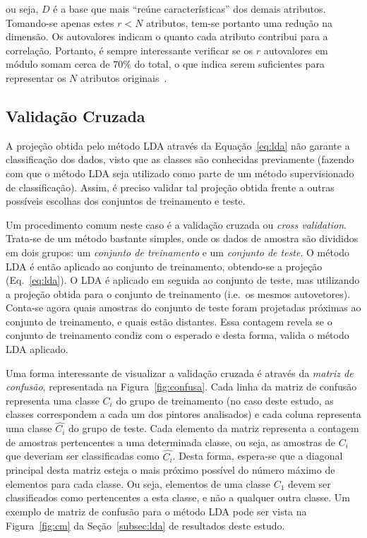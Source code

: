 \noindent ou seja, $D$ é a base que mais ``reúne características'' dos demais
atributos. Tomando-se apenas estes $r < N$ atributos, tem-se portanto uma
redução na dimensão. Os autovalores indicam o quanto cada
atributo contribui para a correlação. Portanto, é sempre interessante verificar se
os $r$ autovalores em módulo somam cerca de $70\%$ do total, o que indica
serem suficientes para representar os $N$ atributos originais~\cite{luciano}.

\subsection{Validação Cruzada}

A projeção obtida pelo método LDA através da Equação~\ref{eq:lda} não
garante a classificação dos dados, visto que as classes são conhecidas
previamente (fazendo com que o método LDA seja utilizado como parte de
um método supervisionado de classificação). Assim, é preciso validar
tal projeção obtida frente a outras possíveis escolhas dos conjuntos
de treinamento e teste.

Um procedimento comum neste caso é a validação cruzada ou
\textit{cross validation}. Trata-se de um método bastante simples,
onde os dados de amostra são divididos em dois grupos: um
\emph{conjunto de treinamento} e um \emph{conjunto de teste}. O método
LDA é então aplicado ao conjunto de treinamento, obtendo-se a projeção
(Eq.~\ref{eq:lda}). O LDA é aplicado em seguida ao conjunto de teste,
mas utilizando a projeção obtida para o conjunto de treinamento
(i.e.\ os mesmos autovetores). Conta-se agora quais amostras do
conjunto de teste foram projetadas próximas ao conjunto de
treinamento, e quais estão distantes. Essa contagem revela se o
conjunto de treinamento condiz com o esperado e desta forma, valida o
método LDA aplicado.

Uma forma interessante de visualizar a validação cruzada é através da
\emph{matriz de confusão}, representada na
Figura~\ref{fig:confusa}. Cada linha da matriz de confusão representa
uma classe $C_i$ do grupo de treinamento (no caso deste estudo, as
classes correspondem a cada um dos pintores analisados) e cada coluna
representa uma classe $\hat{C_i}$ do grupo de teste. Cada elemento da
matriz representa a contagem de amostras pertencentes a uma
determinada classe, ou seja, as amostras de $C_i$ que deveriam ser
classificadas como $\hat{C_i}$. Desta forma, espera-se que a diagonal
principal desta matriz esteja o mais próximo possível do número máximo
de elementos para cada classe. Ou seja, elementos de uma classe $C_1$
devem ser classificados como pertencentes a esta classe, e não a
qualquer outra classe. Um exemplo de matriz de confusão para o método
LDA pode ser vista na Figura~\ref{fig:cm} da Seção~\ref{subsec:lda} de
resultados deste estudo.

